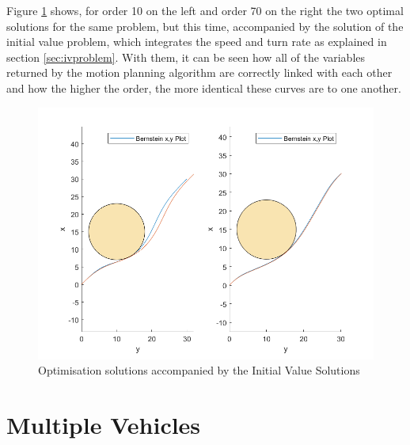 \par Figure \ref{fig:ivpsoundness} shows, for order 10 on the left and order 70 on the right the two optimal solutions for the same problem, but this time, accompanied by the solution of the initial value problem, which integrates the speed and turn rate as explained in section \ref{sec:ivproblem}. With them, it can be seen how all of the variables returned by the motion planning algorithm are correctly linked with each other and how the higher the order, the more identical these curves are to one another.

\begin{figure}[h!]
\centering
\includegraphics[width=\textwidth]{Images/results/ivpsoundness.png}
\caption{Optimisation solutions accompanied by the Initial Value Solutions}
\label{fig:ivpsoundness}
\end{figure}

\section{Multiple Vehicles}

